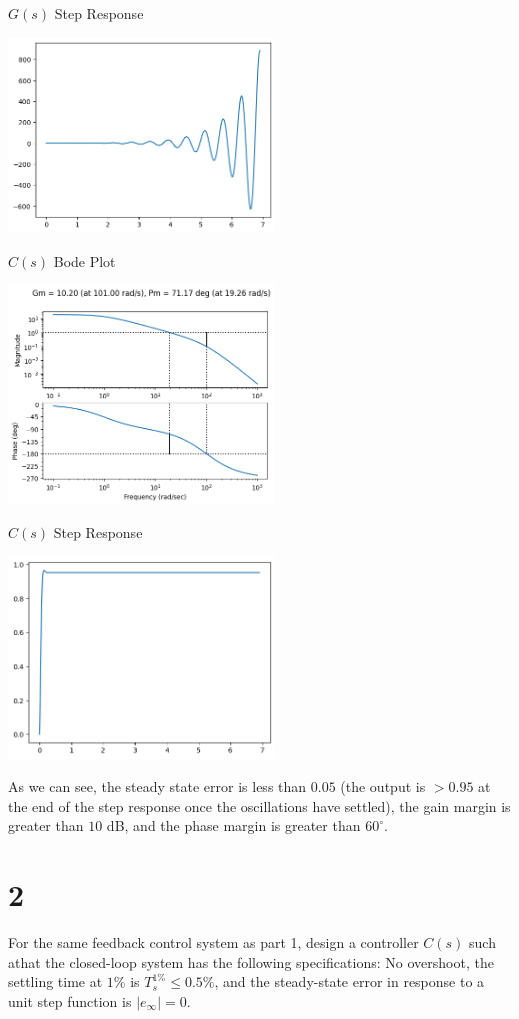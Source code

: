 \documentclass[11pt]{article}
\begin{document}
$G(s)$ Step Response

\includegraphics[width=200pt]{a4_3.png}

$C(s)$ Bode Plot

\includegraphics[width=200pt]{a4_4.png}
  
$C(s)$ Step Response

\includegraphics[width=200pt]{a4_5.png}

As we can see, the steady state error is less than $0.05$ (the output is $> 0.95$ at the end of the step response once the oscillations have settled), the gain margin is greater than $10$ dB, and the phase margin is greater than $60^\circ$.

\section{2}

For the same feedback control system as part 1, design a controller $C(s)$ such athat the closed-loop system has the following specifications: No overshoot, the settling time at $1\%$ is $T_s^{1\%} \leq 0.5\%$, and the steady-state error in response to a unit step function is $|e_\infty| = 0$.
\end{document}
